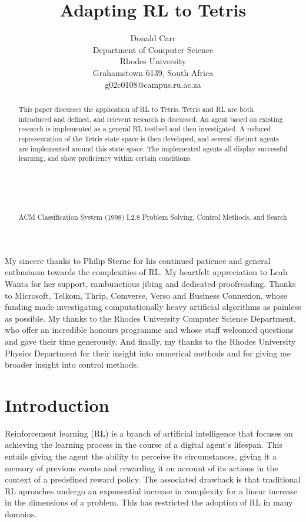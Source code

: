 \documentclass{rucsthesis}
\title{Adapting RL to Tetris}
\author{Donald Carr \\ Department of Computer Science \\ Rhodes University \\ Grahamstown 6139, South Africa \\ g02c0108@campus.ru.ac.za}
\begin{document}
\maketitle

\begin{abstract}

This paper discusses the application of RL to Tetris. Tetris and RL are both introduced and defined, and relevent research is discussed. An agent based on existing research is implemented as a general RL testbed and then investigated. A reduced representation of the Tetris state space is then developed, and several distinct agents are implemented around this state space. The implemented agents all display successful learning, and show proficiency within certain conditions.\\
\\
\\
\\
\\
\\
ACM Classification System (1998) I.2.8 Problem Solving, Control Methods, and Search

\end{abstract}

\begin{acknowledgements}

My sincere thanks to Philip Sterne for his continued patience and general enthusiasm towards the complexities of RL. My heartfelt appreciation to Leah Wanta for her support, rambunctious jibing and dedicated proofreading. Thanks to Microsoft, Telkom, Thrip, Comverse, Verso and Business Connexion, whose funding made investigating computationally heavy artificial algorithms as painless as possible. My thanks to the Rhodes University Computer Science Department, who offer an incredible honours programme and whose staff welcomed questions and gave their time generously. And finally, my thanks to the Rhodes University Physics Department for their insight into numerical methods and for giving me broader insight into control methods.

\end{acknowledgements}

\tableofcontents
\pagebreak
\listoffigures
\pagebreak
\listoftables
\pagebreak

\chapter{Introduction}

Reinforcement learning (RL) is a branch of artificial intelligence that focuses on achieving the learning process in the course of a digital agent's lifespan. This entails giving the agent the ability to perceive its circumstances, giving it a memory of previous events and rewarding it on account of its actions in the context of a predefined reward policy. The associated drawback is that traditional RL aproaches undergo an exponential increase in complexity for a linear increase in the dimensions of a problem. This has restricted the adoption of RL in many domains.
\end{document}
